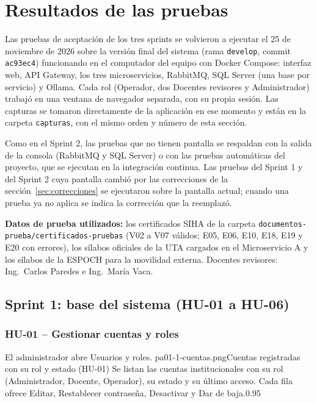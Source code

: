 \clearpage
\section{Resultados de las pruebas}

Las pruebas de aceptación de los tres sprints se volvieron a ejecutar el 25 de noviembre de 2026 sobre la versión final
del sistema (rama \texttt{develop}, commit \texttt{ac93ec4}) funcionando en el computador del equipo con Docker Compose:
interfaz web, API Gateway, los tres microservicios, RabbitMQ, SQL Server (una base por servicio) y Ollama. Cada rol
(Operador, dos Docentes revisores y Administrador) trabajó en una ventana de navegador separada, con su propia sesión.
Las capturas se tomaron directamente de la aplicación en ese momento y están en la carpeta \texttt{capturas}, con el
mismo orden y número de esta sección.

Como en el Sprint 2, las pruebas que no tienen pantalla se respaldan con la salida de la consola (RabbitMQ y SQL Server)
o con las pruebas automáticas del proyecto, que se ejecutan en la integración continua. Las pruebas del Sprint 1 y del
Sprint 2 cuya pantalla cambió por las correcciones de la sección~\ref{sec:correcciones} se ejecutaron sobre la pantalla
actual; cuando una prueba ya no aplica se indica la corrección que la reemplazó.

\textbf{Datos de prueba utilizados:} los certificados SIHA de la carpeta \texttt{documentos-prueba/certificados-pruebas}
(V02 a V07 válidos; E05, E06, E10, E18, E19 y E20 con errores), los sílabos oficiales de la UTA cargados en el
Microservicio A y los sílabos de la ESPOCH para la movilidad externa. Docentes revisores: Ing.~Carlos Paredes e Ing.~María Vaca.

\subsection{Sprint 1: base del sistema (HU-01 a HU-06)}

\subsubsection{HU-01 -- Gestionar cuentas y roles}

{El administrador abre Usuarios y roles.}
{pa01-1-cuentas.png}{Cuentas registradas con su rol y estado (HU-01)}
{Se listan las cuentas institucionales con su rol (Administrador, Docente, Operador), su estado y su último acceso.
Cada fila ofrece Editar, Restablecer contraseña, Desactivar y Dar de baja.}{0.95}

